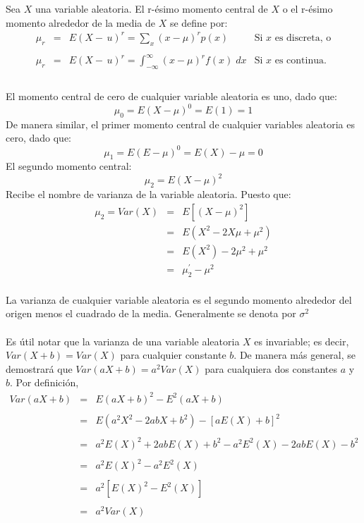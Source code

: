  \begin{tcolorbox}[colframe=white]
     \begin{def.}
	 Sea $X$ una variable aleatoria. El r-ésimo momento central de $X$ o el r-ésimo momento alrededor de la media de $X$ se define por:
	 $$\begin{array}{rcll}
	     \mu_r & = & E(X-\,u)^r = \sum_{x}(x-\mu)^r p(x) &  \mbox{Si $x$ es discreta, o}\\\\
	     \mu_r & = & E(X-\,u)^r = \displaystyle\int_{-\infty}^\infty (x-\mu)^r f(x)\; dx & \mbox{Si $x$ es continua.}\\\\
	 \end{array}$$
     \end{def.}
 \end{tcolorbox}

 El momento central de cero de cualquier variable aleatoria es uno, dado que:
 $$\mu_0 = E(X-\mu)^0 = E(1) = 1$$
 De manera similar, el primer momento central de cualquier variables aleatoria es cero, dado que:
 $$\mu_1 = E(E-\mu)^0 = E(X) - \mu = 0$$
 El segundo momento central:
 $$\mu_2 = E(X-\mu)^2$$
 Recibe el nombre de varianza de la variable aleatoria. Puesto que:
 $$\begin{array}{rcl}
	\mu_2 = Var(X) &=& E\left[(X-\mu)^2\right]\\
		    &=&E(X^2 - 2X\mu + \mu^2)\\
		    &=&E(X^2) - 2\mu^2 + \mu^2\\
		    &=&\mu_2^{'} - \mu^2\\
 \end{array}$$

 La varianza de cualquier variable aleatoria es el segundo momento alrededor del origen menos el cuadrado de la media. Generalmente se denota por $\sigma^2$\\\\
 Es útil notar que la varianza de una variable aleatoria $X$ es invariable; es decir, $Var(X+b) = Var(X)$ para cualquier constante $b$. De manera más general, se demostrará que $Var(aX+b) = a^2Var(X)$ para cualquiera dos constantes $a$ y $b$. Por definición,\\

 $$\begin{array}{rcl}
     Var(aX+b)&=&E(aX+b)^2 - E^2(aX+b)\\\\
	      &=&E(a^2X^2-2abX + b^2)-\left[a E(X)+b\right]^2\\\\
	      &=&a^2E(X)^2 + 2abE(X) + b^2 - a^2E^2(X) - 2abE(X) - b^2\\\\
	      &=&a^2 E(X)^2 - a^2E^2(X)\\\\
	      &=&a^2\left[E(X)^2 - E^2(X)\right]\\\\
	      &=&a^2Var(X)\\\\
 \end{array}$$

